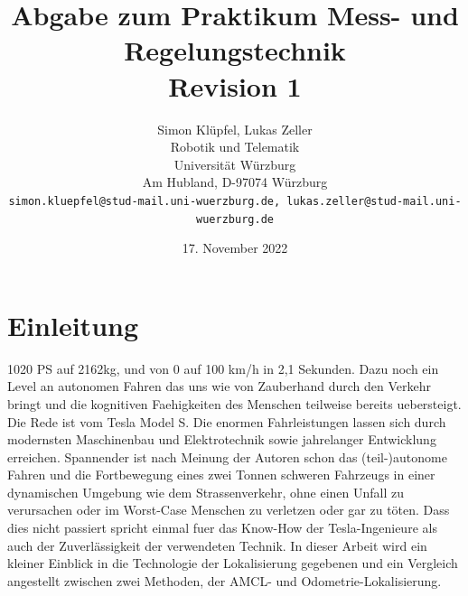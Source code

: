 \documentclass[11pt,a4paper]{article}
\begin{document}
\noindent

\title{\Large \bf Abgabe zum Praktikum Mess- und Regelungstechnik \\ \textbf{Revision 1}}

\author{Simon Klüpfel, Lukas Zeller\\
  Robotik und Telematik \\
  Universität Würzburg\\
  Am Hubland, D-97074 Würzburg\\
{\small \texttt{simon.kluepfel@stud-mail.uni-wuerzburg.de, lukas.zeller@stud-mail.uni-wuerzburg.de}}
}
\date{17. November 2022}

\maketitle

\section{Einleitung}
1020 PS auf 2162kg, und von 0 auf 100 km/h in 2,1 Sekunden\cite{website:tesla}. Dazu noch ein Level an autonomen Fahren das uns wie von Zauberhand durch den Verkehr bringt
und die kognitiven Faehigkeiten des Menschen teilweise bereits uebersteigt. Die Rede ist vom Tesla Model S. Die enormen Fahrleistungen lassen sich durch modernsten Maschinenbau und Elektrotechnik 
sowie jahrelanger Entwicklung erreichen. Spannender ist nach Meinung der Autoren schon das (teil-)autonome Fahren und die Fortbewegung eines 
zwei Tonnen schweren Fahrzeugs in einer dynamischen Umgebung wie dem Strassenverkehr, ohne einen Unfall zu verursachen oder im Worst-Case Menschen zu verletzen oder gar zu töten.
Dass dies nicht passiert spricht einmal fuer das Know-How der Tesla-Ingenieure als auch der Zuverlässigkeit der verwendeten Technik. In dieser Arbeit wird 
ein kleiner Einblick in die Technologie der Lokalisierung gegebenen und ein Vergleich angestellt zwischen zwei Methoden, der AMCL- und Odometrie-Lokalisierung.
\end{document}
